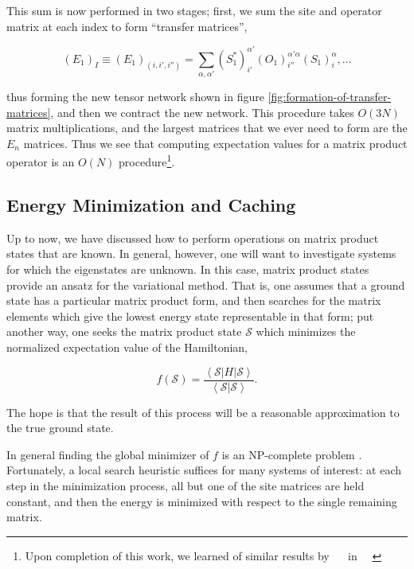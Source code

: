 \documentclass{amsbook}
\theoremstyle{plain}
\theoremstyle{definition}
\theoremstyle{remark}
\newcommand{\cip}[2]{\left<#1|#2\right>}
\newcommand{\coip}[3]{\left<#1\left|#2\right|#3\right>}
\newcommand{\paren}[1]{\left(#1\right)}
\begin{document}
This sum is now performed in two stages;  first, we sum the site and operator matrix at each index to form ``transfer matrices'',

$$\paren{E_1}_I \equiv \paren{E_1}_{(i,i',i'')}
                 = \sum_{\alpha,\alpha'} \paren{S^*_1}^{\alpha'}_{i'}\paren{O_1}^{\alpha'\alpha}_{i''}\paren{S_1}^{\alpha}_i, \dots$$

\noindent thus forming the new tensor network shown in figure \ref{fig:formation-of-transfer-matrices}, and then we contract the new network.  This procedure takes $O(3N)$ matrix multiplications, and the largest matrices that we ever need to form are the $E_n$ matrices.  Thus we see that computing expectation values for a matrix product operator is an $O(N)$ procedure\footnote{Upon completion of this work, we learned of similar results by \underline{$\quad$} in \underline{$\quad$}}.
\subsection{Energy Minimization and Caching}

\label{caching}

Up to now, we have discussed how to perform operations on matrix product states that are known.  In general, however, one will want to investigate systems for which the eigenstates are unknown.  In this case, matrix product states provide an ansatz for the variational method.  That is, one assumes that a ground state has a particular matrix product form, and then searches for the matrix elements which give the lowest energy state representable in that form;  put another way, one seeks the matrix product state $\mathscr{S}$ which minimizes the normalized expectation value of the Hamiltonian,

$$f(\mathscr{S}) = \frac{\coip{\mathscr{S}}{H}{\mathscr{S}}}{\cip{\mathscr{S}}{\mathscr{S}}}.$$

\noindent The hope is that the result of this process will be a reasonable approximation to the true ground state.

In general finding the global minimizer of $f$ is an NP-complete problem \cite{quant-ph/0609051}.  Fortunately, a local search heuristic suffices for many systems of interest:  at each step in the minimization process, all but one of the site matrices are held constant, and then the energy is minimized with respect to the single remaining matrix.
\end{document}
